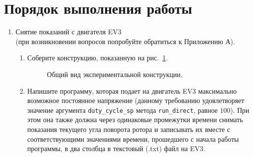 \documentclass[12pt,a4paper,openany]{extarticle}
\begin{document}
\section{Порядок выполнения работы}
\begin{enumerate}
\item Снятие показаний с двигателя EV3\\(при возникновении вопросов попробуйте обратиться к Приложению А).
\begin{enumerate}
\item Соберите конструкцию, показанную на рис.~\ref{brick}.\\
\begin{figure}[h]
	\noindent{}
	\caption{Общий вид экспериментальной конструкции.}
	\label{brick}
\end{figure}
\item Напишите программу, которая подает на двигатель EV3 максимально возможное постоянное напряжение (данному требованию удовлетворяет значение аргумента \verb|duty_cycle_sp| метода \verb|run_direct|, равное $100$).
При этом она также должна через одинаковые промежутки времени снимать показания текущего угла поворота ротора и записывать их вместе с соответствующими значениями времени, прошедшего с начала работы программы, в два столбца в текстовый (.txt) файл на EV3. 


\end{enumerate}
\end{enumerate}
\end{document}
